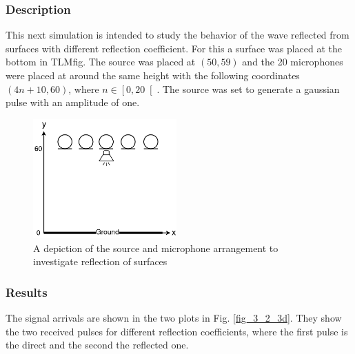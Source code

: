 \documentclass[twocolumn]{article}
\begin{document}
\subsubsection{Description}
This next simulation is intended to study the behavior of the wave reflected from
surfaces with different reflection coefficient.
For this a surface was placed at the bottom in TLMfig.
The source was placed at $\left(50,59\right)$ and the 20 microphones were
placed at around the same height with the following coordinates
$\left(4n+10,60\right)$, where $n\in\left[0,20\right[$.
The source was set to generate a gaussian pulse with an amplitude of one.

\begin{figure}[H]
    \centering
    \includegraphics[width=55mm]{./Images/tlmfig_3_2.png}
    \caption{A depiction of the source and microphone arrangement to investigate reflection of surfaces}
    \label{fig_3_2_example}
\end{figure}

\subsubsection{Results}
The signal arrivals are shown in the two plots in Fig. \ref{fig_3_2_3d}.
They show the two received pulses for different reflection coefficients, where
the first pulse is the direct and the second the reflected one.
\end{document}
